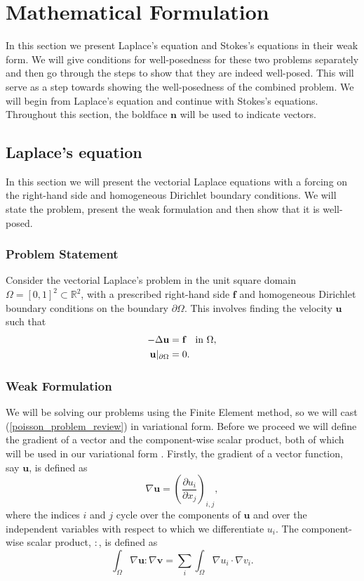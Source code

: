 \documentclass[12pt,a4paper]{article}
\theoremstyle{definition}
\begin{document}
\section{Mathematical Formulation}\label{sec_mathform}
In this section we present Laplace's equation and Stokes's equations in their weak form.   We will give conditions for well-posedness for these two problems separately and then go through the steps to show that they are indeed well-posed.  This will serve as a step towards showing the well-posedness of the combined problem.  We will begin from Laplace's equation and continue with Stokes's equations.  Throughout this section, the boldface $\textbf{n}$ will be used to indicate vectors.

\subsection{Laplace's equation}
In this section we will present the vectorial Laplace equations with a forcing on the right-hand side and homogeneous Dirichlet boundary conditions.  We will state the problem, present the weak formulation and then show that it is well-posed.
\subsubsection{Problem Statement}
Consider the vectorial Laplace's problem in the unit square domain  $\Omega = \left[0,1\right]^2 \subset \mathbb{R}^2$, with a prescribed right-hand side $\textbf{f}$ and homogeneous Dirichlet boundary conditions on the boundary $\partial \Omega$.  This involves finding the velocity $\textbf{u}$ such that
\begin{equation} \label{poisson_problem_review}
\begin{aligned}
-\Delta\textbf{u}&= \textbf{f}\text{\quad in $\Omega$},\\
\textbf{u}|_{\partial\Omega}&=0 .
\end{aligned}
\end{equation}
\subsubsection{Weak Formulation}
We will be solving our problems using the Finite Element method, so we will cast (\ref{poisson_problem_review}) in variational form.  Before we proceed we will define the gradient of a vector and the component-wise scalar product, both of which will be used in our variational form .
Firstly, the gradient of a vector function, say $\textbf{u}$, is defined as
\begin{equation}
\nabla \textbf{u} = \left(\frac{\partial u_i}{\partial x_j}\right)_{i,j},\nonumber
\end{equation}
where the indices $i$ and $j$ cycle over the components of $\textbf{u}$ and over the independent variables with respect to which we differentiate $u_i$.   The component-wise scalar product, $:$, is defined as
\begin{equation}\label{poisson_review_back_varform}
\int_{\Omega}\nabla \textbf{u} : \nabla \textbf{v}=	\sum_{i}\int_{\Omega}\nabla u_i \cdot \nabla v_i.\nonumber
\end{equation}
\end{document}
